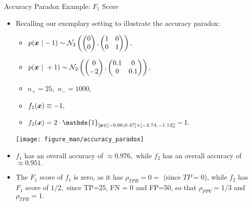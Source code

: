 \begin{vbframe}{Accuracy Paradox Example: $F_1$ Score}
	\footnotesize
	\begin{itemize}
		\item Recalling our exemplary setting to illustrate the accuracy paradox:
		
		\begin{minipage}{0.55\textwidth}    
			\begin{itemize}
				\scriptsize
				\item $p(\bm{x} ~| -1) \sim \mathcal{N}_2\left( 
				\begin{pmatrix}
					0 \\ 0
				\end{pmatrix}  , 
				\begin{pmatrix}
					1  & 0 \\ 0 & 1
				\end{pmatrix}   \right), $
				\item  $p(\bm{x} ~| ~ +1) \sim \mathcal{N}_2\left( 
				\begin{pmatrix}
					0 \\ -2
				\end{pmatrix}  , 
				\begin{pmatrix}
					0.1  & 0 \\ 0 & 0.1
				\end{pmatrix}   \right),  $
				\item $n_+ = 25,$ $n_- = 1000,$
%				
				\item $f_1(\bm{x}) \equiv -1,$ 
%				
				\item  $f_2(\xv) = 2 \cdot \mathds{1}_{[ \xv \in [-0.66,0.47]\times [-2.74,-1.12] ]} -1.$
			\end{itemize}
		\end{minipage}
		\begin{minipage}{0.35\textwidth}    
			\begin{center}
				\texttt{[image: figure\_man/accuracy\_paradox]}
			\end{center}
		\end{minipage}
		\item $f_1$ has an overall accuracy of $\approx 0.976,$ while $f_2$ has an overall accuracy of $\approx 0.951.$
		\item The $F_1$ score of $f_1$ is zero, as it has $\rho_{TPR}=0=$ (since $TP=0$), while $f_2$ has  $F_1$ score of $1/2,$ since TP=25, FN = 0 and FP=50, so that $\rho_{PPV}=1/3$ and $\rho_{TPR}=1.$
	\end{itemize}
\end{vbframe} 




